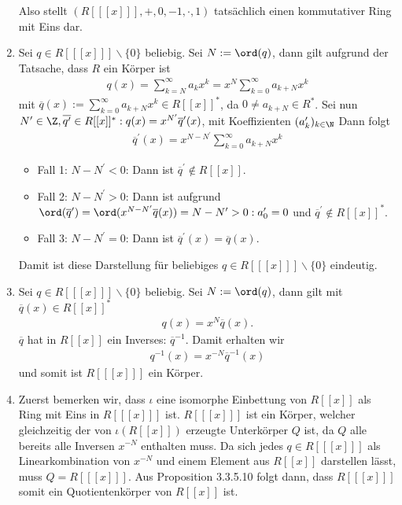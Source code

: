 \begin{solution}
\begin{enumerate}
  Also stellt $(R[[[x]]],+,0,-1,\cdot,1)$ tatsächlich einen kommutativer Ring mit Eins dar.
  \item Sei $q \in R[[[x]]]\backslash \{0\}$ beliebig. Sei $N := \ord(q)$, dann gilt
  aufgrund der Tatsache, dass $R$ ein Körper ist
  \begin{align*}
    q(x) = \sum_{k = N}^{\infty}a_kx^k = x^{N}\sum_{k = 0}^{\infty}a_{k+N}x^k
  \end{align*}
  mit $\overline{q}(x) := \sum_{k = 0}^{\infty}a_{k+N}x^k \in R[[x]]^*$, da $0 \neq a_{k+N} \in R^*$.
  Sei nun $N^{\prime} \in \Z, \overline{q^{\prime}} \in R[[x]]^*: q(x) = x^{N^{\prime}}\overline{q}^{\prime}(x)$,
  mit Koeffizienten $(a_k^{\prime})_{k \in \N}$
  Dann folgt
  \begin{align*}
    \overline{q}^{\prime}(x) = x^{N-N^{\prime}}\sum_{k = 0}^{\infty}a_{k+N}x^k
  \end{align*}
  \begin{itemize}
    \item Fall 1: $N-N^{\prime} < 0$: Dann ist $\overline{q}^{\prime} \notin R[[x]]$.
    \item Fall 2: $N-N^{\prime} > 0$: Dann ist aufgrund
    $\ord(\overline{q}^{\prime}) = \ord(x^{N-N^{\prime}}\overline{q}(x)) = N - N^{\prime} > 0: a_0^{\prime} = 0$
    und $\overline{q}^{\prime} \notin R[[x]]^*$.
    \item Fall 3: $N-N^{\prime} = 0$: Dann ist $\overline{q}^{\prime}(x) = \overline{q}(x)$.
  \end{itemize}
  Damit ist diese Darstellung für beliebiges $q \in R[[[x]]]\backslash \{0\}$ eindeutig.
  \item Sei $q \in R[[[x]]]\backslash \{0\}$ beliebig. Sei $N := \ord(q)$, dann gilt
  mit $\overline{q}(x) \in R[[x]]^*$
  \begin{align*}
    q(x) = x^{N}\overline{q}(x).
  \end{align*}
  $\overline{q}$ hat in $R[[x]]$ ein Inverses: $\overline{q}^{-1}$. Damit erhalten wir
  \begin{align*}
    q^{-1}(x) = x^{-N}\overline{q}^{-1}(x)
  \end{align*}
  und somit ist $R[[[x]]]$ ein Körper.
  \item Zuerst bemerken wir, dass $\iota$ eine isomorphe Einbettung von $R[[x]]$
  als Ring mit Eins in $R[[[x]]]$ ist. $R[[[x]]]$ ist ein Körper, welcher gleichzeitig
  der von $\iota(R[[x]])$ erzeugte Unterkörper $Q$ ist, da $Q$ alle bereits alle
  Inversen $x^{-N}$ enthalten muss. Da sich jedes $q \in R[[[x]]]$ als Linearkombination von
  $x^{-N}$ und einem Element aus $R[[x]]$ darstellen lässt, muss $Q = R[[[x]]]$.
  Aus Proposition 3.3.5.10 folgt dann, dass $R[[[x]]]$ somit ein Quotientenkörper
  von $R[[x]]$ ist.
\end{enumerate}
\end{solution}
